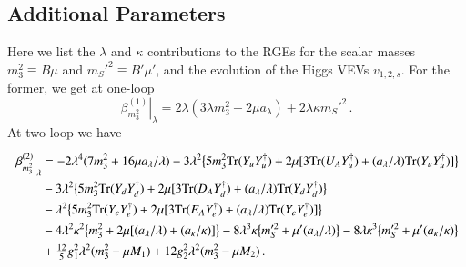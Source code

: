 \documentclass[final,3p,times,pdflatex]{elsarticle}
\newcommand{\lamsq}{\lambda^2}
\newcommand{\kapsq}{\kappa^2}
\newcommand{\tr}{\mathrm{Tr}}
\newcommand{\mtrisq}{m_3^2}
\newcommand{\msprsq}{m_S'^2}
\begin{document}
\subsection{Additional Parameters}
Here we list the $\lambda$ and $\kappa$ contributions to the RGEs for the scalar masses $\mtrisq \equiv B\mu$ and $\msprsq \equiv B'\mu'$, and the evolution of the Higgs VEVs $v_{1,2,s}$.  For the former, we get at one-loop
%
\begin{equation}
\left.\beta_{\mtrisq}^{(1)}\right|_\lambda = 2\lambda(3\lambda\mtrisq + 2\mu a_\lambda) + 2\lambda\kappa\msprsq\,.
\end{equation}
%
At two-loop we have
%
\begin{align}
\left.\beta_{\mtrisq}^{(2)}\right|_\lambda &= -2\lambda^4(7\mtrisq + 16\mu a_\lambda/\lambda) -3\lamsq\big\{ 5\mtrisq\tr( Y_u Y_u^\dagger) 
+ 2\mu[3\tr( U_A Y_u^\dagger) + (a_\lambda/\lambda)\tr( Y_u Y_u^\dagger)] \big\} \notag \\
%
&-3\lamsq\big\{ 5\mtrisq\tr( Y_d Y_d^\dagger) + 2\mu[3\tr( D_A Y_d^\dagger) 
+ (a_\lambda/\lambda)\tr( Y_d Y_d^\dagger) \big\} \notag \\
%
&-\lamsq\big\{5\mtrisq\tr( Y_e Y_e^\dagger) 
+ 2\mu[3\tr( E_A Y_e^\dagger) + (a_\lambda/\lambda)\tr( Y_e Y_e^\dagger)] \big\} \notag \\
%
&-4\lamsq\kapsq\big\{ \mtrisq + 2\mu[(a_\lambda/\lambda) + (a_\kappa/\kappa)] \big\} 
-8\lambda^3\kappa\big\{ m_S'^2 + \mu'(a_\lambda/\lambda)\big\} - 8\lambda\kappa^3\big\{m_S'^2 + \mu'(a_\kappa/\kappa)\big\} \notag \\
%
&+\tfrac{12}{5}g_1^2\lamsq(\mtrisq - \mu M_1) + 12g_2^2\lamsq(\mtrisq -\mu M_2) \,.
\end{align}
\end{document}
